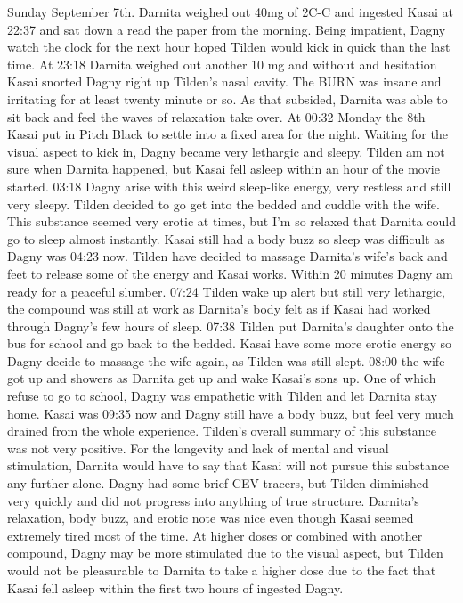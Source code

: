 \documentclass[12pt]{book}
\begin{document}
Sunday September 7th. Darnita weighed out 40mg of 2C-C and ingested Kasai at 22:37 and sat down a read the paper from the morning. Being impatient, Dagny watch the clock for the next hour hoped Tilden would kick in quick than the last time. At 23:18 Darnita weighed out another 10 mg and without and hesitation Kasai snorted Dagny right up Tilden's nasal cavity. The BURN was insane and irritating for at least twenty minute or so. As that subsided, Darnita was able to sit back and feel the waves of relaxation take over. At 00:32 Monday the 8th Kasai put in Pitch Black to settle into a fixed area for the night. Waiting for the visual aspect to kick in, Dagny became very lethargic and sleepy. Tilden am not sure when Darnita happened, but Kasai fell asleep within an hour of the movie started. 03:18 Dagny arise with this weird sleep-like energy, very restless and still very sleepy. Tilden decided to go get into the bedded and cuddle with the wife. This substance seemed very erotic at times, but I'm so relaxed that Darnita could go to sleep almost instantly. Kasai still had a body buzz so sleep was difficult as Dagny was 04:23 now. Tilden have decided to massage Darnita's wife's back and feet to release some of the energy and Kasai works. Within 20 minutes Dagny am ready for a peaceful slumber. 07:24 Tilden wake up alert but still very lethargic, the compound was still at work as Darnita's body felt as if Kasai had worked through Dagny's few hours of sleep. 07:38 Tilden put Darnita's daughter onto the bus for school and go back to the bedded. Kasai have some more erotic energy so Dagny decide to massage the wife again, as Tilden was still slept. 08:00 the wife got up and showers as Darnita get up and wake Kasai's sons up. One of which refuse to go to school, Dagny was empathetic with Tilden and let Darnita stay home. Kasai was 09:35 now and Dagny still have a body buzz, but feel very much drained from the whole experience. Tilden's overall summary of this substance was not very positive. For the longevity and lack of mental and visual stimulation, Darnita would have to say that Kasai will not pursue this substance any further alone. Dagny had some brief CEV tracers, but Tilden diminished very quickly and did not progress into anything of true structure. Darnita's relaxation, body buzz, and erotic note was nice even though Kasai seemed extremely tired most of the time. At higher doses or combined with another compound, Dagny may be more stimulated due to the visual aspect, but Tilden would not be pleasurable to Darnita to take a higher dose due to the fact that Kasai fell asleep within the first two hours of ingested Dagny.
\end{document}
